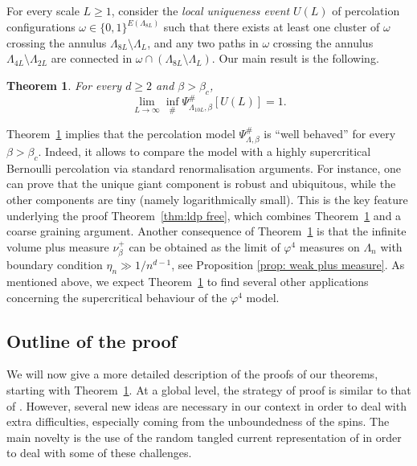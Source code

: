 \documentclass[11pt,a4paper]{article}
\newtheorem{theorem}{Theorem}[section]
\theoremstyle{definition}
\numberwithin{equation}{section}
\begin{document}
For every scale $L\geq1$, consider the \emph{local uniqueness event} $U(L)$ of percolation configurations $\omega\in \{0,1\}^{E(\Lambda_{8L})}$ such that there exists at least one cluster of $\omega$ crossing the annulus $\Lambda_{8L}\setminus \Lambda_L$, and any two paths in $\omega$ crossing the annulus $\Lambda_{4L}\setminus \Lambda_{2L}$ are connected in $\omega\cap(\Lambda_{8L}\setminus \Lambda_L)$. Our main result is the following. 


\begin{theorem}\label{thm: local uniqueness}
For every $d\geq 2$ and $\beta>\beta_c$, 
\begin{equation}
\lim_{L\to\infty}\inf_{\#}\Psi^{\#}_{\Lambda_{10L},\beta}[U(L)]= 1.    
\end{equation}
\end{theorem}

Theorem~\ref{thm: local uniqueness} implies that the percolation model $\Psi_{\Lambda,\beta}^{\#}$ is ``well behaved'' for every $\beta>\beta_c$. Indeed, it allows to compare the model with a highly supercritical Bernoulli percolation via standard renormalisation arguments. For instance, one can prove that the unique giant component is robust and ubiquitous, while the other components are tiny (namely logarithmically small). 
This is the key feature underlying the proof Theorem~\ref{thm:ldp free}, which combines Theorem~\ref{thm: local uniqueness} and a coarse graining argument. Another consequence of Theorem~\ref{thm: local uniqueness} is that the infinite volume plus measure $\nu_\beta^+$ can be obtained as the limit of $\varphi^4$ measures on $\Lambda_n$ with boundary condition $\eta_n\gg 1/n^{d-1}$, see Proposition \textup{\ref{prop: weak plus measure}}.
As mentioned above, we expect Theorem~\ref{thm: local uniqueness} to find several other applications concerning the supercritical behaviour of the $\varphi^4$ model.




\subsection{Outline of the proof}

We will now give a more detailed description of the proofs of our theorems, starting with Theorem~\ref{thm: local uniqueness}. At a global level, the strategy of proof is similar to that of \cite{Bod05,Severo24}.  However, several new ideas are necessary in our context in order to deal with extra difficulties, especially coming from the unboundedness of the spins. The main novelty is the use of the random tangled current representation of \cite{GunaratnamPanagiotisPanisSeveroPhi42022} in order to deal with some of these challenges.
\end{document}
